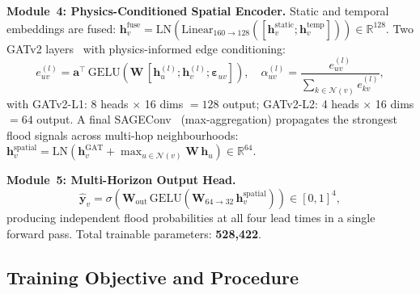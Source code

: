 \documentclass[10pt,twocolumn]{article}
\newcommand{\mat}[1]{\mathbf{#1}}
\newcommand{\RR}{\mathbb{R}}
\begin{document}
\smallskip\noindent\textbf{Module~4: Physics-Conditioned Spatial Encoder.}
Static and temporal embeddings are fused:
$\bm{h}_v^{\text{fuse}} = \mathrm{LN}(\mathrm{Linear}_{160\to 128}
([\bm{h}_v^{\text{static}};\bm{h}_v^{\text{temp}}]))\in\RR^{128}$.
Two GATv2 layers~\cite{brody2022} with physics-informed edge conditioning:
\begin{equation}
  e_{uv}^{(l)} =
    \bm{a}^{\top}\,\mathrm{GELU}\!\left(
      \mat{W}\,[\bm{h}_u^{(l)};\bm{h}_v^{(l)};\bm{\varepsilon}_{uv}]
    \right),
  \quad
  \alpha_{uv}^{(l)} = \frac{e_{uv}^{(l)}}{\sum_{k\in\mathcal{N}(v)} e_{kv}^{(l)}},
\end{equation}
with GATv2-L1: 8 heads $\times$ 16 dims $= 128$ output;
GATv2-L2: 4 heads $\times$ 16 dims $= 64$ output.
A final SAGEConv~\cite{hamilton2017} (max-aggregation) propagates the
strongest flood signals across multi-hop neighbourhoods:
$\bm{h}_v^{\text{spatial}} = \mathrm{LN}(\bm{h}_v^{\text{GAT}}
+ \max_{u\in\mathcal{N}(v)}\mat{W}\,\bm{h}_u)\in\RR^{64}$.

\smallskip\noindent\textbf{Module~5: Multi-Horizon Output Head.}
\begin{equation}
  \hat{\bm{y}}_v = \sigma\!\left(
    \mat{W}_{\text{out}}\,\mathrm{GELU}(\mat{W}_{64\to 32}\,\bm{h}_v^{\text{spatial}})
  \right) \in [0,1]^4,
\end{equation}
producing independent flood probabilities at all four lead times in a
single forward pass.
Total trainable parameters: \textbf{528,422}.

\subsection{Training Objective and Procedure}
\label{sec:training}
\end{document}
